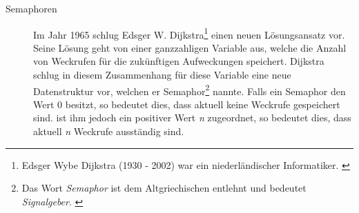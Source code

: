 \begin{description}
\begin{description}
							\item[Semaphoren]
							
								Im Jahr 1965 schlug Edsger W. Dijkstra\footnote{Edsger Wybe Dijkstra (1930 - 2002) war ein niederländischer Informatiker. \cite{DijkstraWikipedia}} einen neuen Lösungsansatz vor. Seine Lösung geht von einer ganzzahligen Variable aus, welche die Anzahl von Weckrufen für die zukünftigen Aufweckungen speichert. Dijkstra schlug in diesem Zusammenhang für diese Variable eine neue Datenstruktur vor, welchen er Semaphor\footnote{Das Wort \textit{Semaphor} ist dem Altgriechischen entlehnt und bedeutet \textit{Signalgeber}. \cite{SemaphorWikipedia}} nannte. Falls ein Semaphor den Wert 0 besitzt, so bedeutet dies, dass aktuell keine Weckrufe gespeichert sind. ist ihm jedoch ein positiver Wert \textit{n} zugeordnet, so bedeutet dies, dass aktuell \textit{n} Weckrufe ausständig sind.\\

\end{description}
\end{description}
